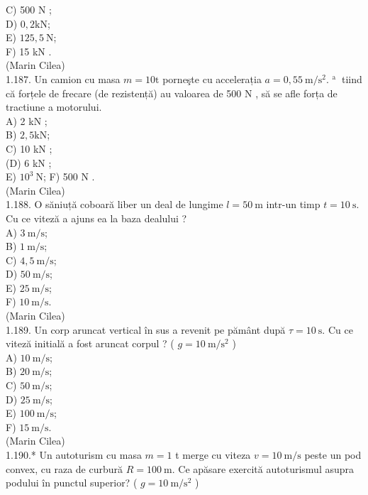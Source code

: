 \documentclass[10pt]{article}
\begin{document}
C) 500 N ;\\
D) $0,2 \mathrm{kN}$;\\
E) $125,5 \mathrm{~N}$;\\
F) 15 kN .\\
(Marin Cilea)\\
1.187. Un camion cu masa $m=10 \mathrm{t}$ porneşte cu accelerația $a=0,55 \mathrm{~m} / \mathrm{s}^{2}$. ${ }^{\text {a }}$ tiind că forțele de frecare (de rezistență) au valoarea de 500 N , să se afle forța de tractiune a motorului.\\
A) 2 kN ;\\
B) $2,5 \mathrm{kN}$;\\
C) 10 kN ;\\
(D) 6 kN ;\\
E) $10^{3} \mathrm{~N}$; F) 500 N .\\
(Marin Cilea)\\
1.188. O săniuță coboară liber un deal de lungime $l=50 \mathrm{~m}$ intr-un timp $t=10 \mathrm{~s}$. Cu ce viteză a ajuns ea la baza dealului ?\\
A) $3 \mathrm{~m} / \mathrm{s}$;\\
B) $1 \mathrm{~m} / \mathrm{s}$;\\
C) $4,5 \mathrm{~m} / \mathrm{s}$;\\
D) $50 \mathrm{~m} / \mathrm{s}$;\\
E) $25 \mathrm{~m} / \mathrm{s}$;\\
F) $10 \mathrm{~m} / \mathrm{s}$.\\
(Marin Cilea)\\
1.189. Un corp aruncat vertical în sus a revenit pe pământ după $\tau=10 \mathrm{~s}$. Cu ce viteză initială a fost aruncat corpul ? ( $g=10 \mathrm{~m} / \mathrm{s}^{2}$ )\\
A) $10 \mathrm{~m} / \mathrm{s}$;\\
B) $20 \mathrm{~m} / \mathrm{s}$;\\
C) $50 \mathrm{~m} / \mathrm{s}$;\\
D) $25 \mathrm{~m} / \mathrm{s}$;\\
E) $100 \mathrm{~m} / \mathrm{s}$;\\
F) $15 \mathrm{~m} / \mathrm{s}$.\\
(Marin Cilea)\\
1.190.* Un autoturism cu masa $m=1$ t merge cu viteza $v=10 \mathrm{~m} / \mathrm{s}$ peste un pod convex, cu raza de curbură $R=100 \mathrm{~m}$. Ce apăsare exercită autoturismul asupra podului în punctul superior? ( $g=10 \mathrm{~m} / \mathrm{s}^{2}$ )\\
\end{document}
